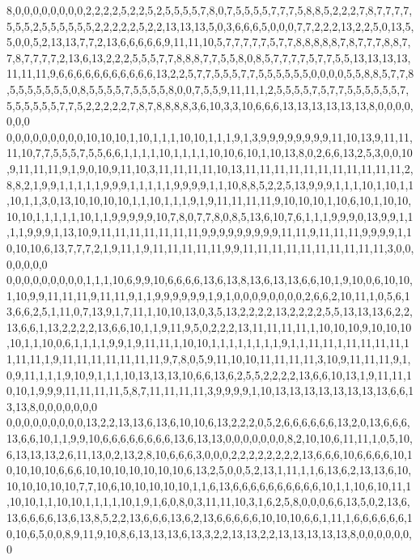 8,0,0,0,0,0,0,0,0,2,2,2,2,5,2,2,5,2,5,5,5,5,7,8,0,7,5,5,5,5,7,7,7,5,8,8,5,2,2,2,7,8,7,7,7,7,5,5,5,2,5,5,5,5,5,5,2,2,2,2,2,5,2,2,13,13,13,5,0,3,6,6,6,5,0,0,0,7,7,2,2,2,13,2,2,5,0,13,5,5,0,0,5,2,13,13,7,7,2,13,6,6,6,6,6,9,11,11,10,5,7,7,7,7,7,5,7,7,8,8,8,8,8,7,8,7,7,7,8,8,7,7,8,7,7,7,7,2,13,6,13,2,2,2,5,5,5,7,7,8,8,8,7,7,5,5,8,0,8,5,7,7,7,7,5,7,7,5,5,13,13,13,13,11,11,11,9,6,6,6,6,6,6,6,6,6,6,6,13,2,2,5,7,7,5,5,5,7,7,5,5,5,5,5,5,0,0,0,0,5,5,8,8,5,7,7,8,5,5,5,5,5,5,5,0,8,5,5,5,5,7,5,5,5,5,8,0,0,7,5,5,9,11,11,1,2,5,5,5,5,7,5,7,7,5,5,5,5,5,5,7,5,5,5,5,5,5,7,7,5,2,2,2,2,2,7,8,7,8,8,8,8,3,6,10,3,3,10,6,6,6,13,13,13,13,13,13,8,0,0,0,0,0,0,0
0,0,0,0,0,0,0,0,0,10,10,10,1,10,1,1,1,10,10,1,1,1,9,1,3,9,9,9,9,9,9,9,9,11,10,13,9,11,11,11,10,7,7,5,5,5,7,5,5,6,6,1,1,1,1,10,1,1,1,1,10,10,6,10,1,10,13,8,0,2,6,6,13,2,5,3,0,0,10,9,11,11,11,9,1,9,0,10,9,11,10,3,11,11,11,11,10,13,11,11,11,11,11,11,11,11,11,11,11,2,8,8,2,1,9,9,1,1,1,1,1,9,9,9,1,1,1,1,1,9,9,9,9,1,1,10,8,8,5,2,2,5,13,9,9,9,1,1,1,10,1,10,1,1,10,1,1,3,0,13,10,10,10,10,1,1,10,1,1,1,9,1,9,11,11,11,11,9,10,10,10,1,10,6,10,1,10,10,10,10,1,1,1,1,1,10,1,1,9,9,9,9,9,10,7,8,0,7,7,8,0,8,5,13,6,10,7,6,1,1,1,9,9,9,0,13,9,9,1,1,1,1,9,9,9,1,13,10,9,11,11,11,11,11,11,11,9,9,9,9,9,9,9,9,9,11,11,9,11,11,11,9,9,9,9,1,10,10,10,6,13,7,7,7,2,1,9,11,1,9,11,11,11,11,11,9,9,11,11,11,11,11,11,11,11,11,11,3,0,0,0,0,0,0,0
0,0,0,0,0,0,0,0,0,1,1,1,10,6,9,9,10,6,6,6,6,13,6,13,8,13,6,13,13,6,6,10,1,9,10,0,6,10,10,1,10,9,9,11,11,11,9,11,11,9,1,1,9,9,9,9,9,9,1,9,1,0,0,0,9,0,0,0,0,2,6,6,2,10,11,1,0,5,6,13,6,6,2,5,1,11,0,7,13,9,1,7,11,1,10,10,13,0,3,5,13,2,2,2,2,13,2,2,2,2,5,5,13,13,13,6,2,2,13,6,6,1,13,2,2,2,2,13,6,6,10,1,1,9,11,9,5,0,2,2,2,13,11,11,11,11,1,10,10,10,9,10,10,10,10,1,1,10,0,6,1,1,1,1,9,9,1,9,11,11,1,10,10,1,1,1,1,1,1,1,1,9,1,1,11,11,1,11,11,11,11,11,11,11,1,9,11,11,11,11,11,11,11,9,7,8,0,5,9,11,10,10,11,11,11,11,3,10,9,11,11,11,9,1,0,9,11,1,1,1,9,10,9,1,1,1,10,13,13,13,10,6,6,13,6,2,5,5,2,2,2,2,13,6,6,10,13,1,9,11,11,10,10,1,9,9,9,11,11,11,11,5,8,7,11,11,11,11,3,9,9,9,9,1,10,13,13,13,13,13,13,13,13,6,6,13,13,8,0,0,0,0,0,0,0
0,0,0,0,0,0,0,0,0,13,2,2,13,13,6,13,6,10,10,6,13,2,2,2,0,5,2,6,6,6,6,6,6,13,2,0,13,6,6,6,13,6,6,10,1,1,9,9,10,6,6,6,6,6,6,6,6,13,6,13,13,0,0,0,0,0,0,0,8,2,10,10,6,11,11,1,0,5,10,6,13,13,13,2,6,11,13,0,2,13,2,8,10,6,6,6,3,0,0,0,2,2,2,2,2,2,2,2,13,6,6,6,10,6,6,6,6,10,10,10,10,10,6,6,6,10,10,10,10,10,10,10,6,13,2,5,0,0,5,2,13,1,11,1,1,6,13,6,2,13,13,6,10,10,10,10,10,10,7,7,10,6,10,10,10,10,10,1,1,6,13,6,6,6,6,6,6,6,6,6,6,10,1,1,10,6,10,11,1,10,10,1,1,10,10,1,1,1,1,10,1,9,1,6,0,8,0,3,11,11,10,3,1,6,2,5,8,0,0,0,6,6,13,5,0,2,13,6,13,6,6,6,6,13,6,13,8,5,2,2,13,6,6,6,13,6,2,13,6,6,6,6,6,10,10,10,6,6,1,11,1,6,6,6,6,6,6,10,10,6,5,0,0,8,9,11,9,10,8,6,13,13,13,6,13,3,2,2,13,13,2,2,13,13,13,13,13,8,0,0,0,0,0,0,0
